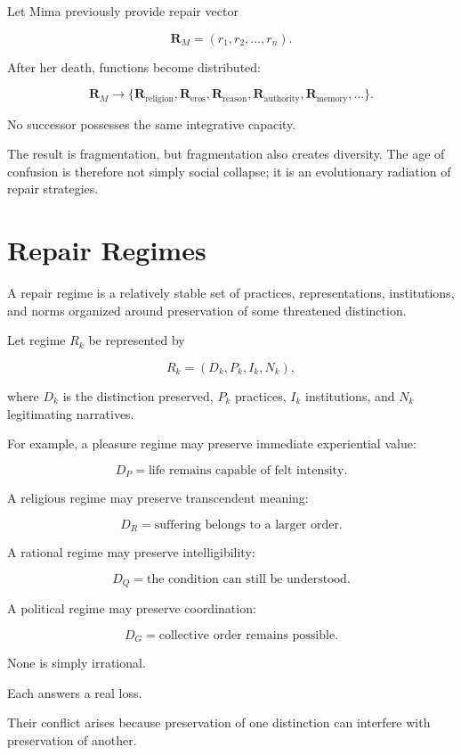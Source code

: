 \documentclass[11pt,oneside]{book}
\theoremstyle{definition}
\theoremstyle{remark}
\begin{document}
Let Mima previously provide repair vector

\[
\mathbf R_M
=
(r_1,r_2,\ldots,r_n).
\]

After her death, functions become distributed:

\[
\mathbf R_M
\rightarrow
\{
\mathbf R_{\mathrm{religion}},
\mathbf R_{\mathrm{eros}},
\mathbf R_{\mathrm{reason}},
\mathbf R_{\mathrm{authority}},
\mathbf R_{\mathrm{memory}},
\ldots
\}.
\]

No successor possesses the same integrative capacity.

The result is fragmentation, but fragmentation also creates diversity. The age of confusion is therefore not simply social collapse; it is an evolutionary radiation of repair strategies.

\section{Repair Regimes}

A repair regime is a relatively stable set of practices, representations, institutions, and norms organized around preservation of some threatened distinction.

Let regime \(R_k\) be represented by

\[
R_k
=
(D_k,P_k,I_k,N_k),
\]

where \(D_k\) is the distinction preserved, \(P_k\) practices, \(I_k\) institutions, and \(N_k\) legitimating narratives.

For example, a pleasure regime may preserve immediate experiential value:

\[
D_P
=
\text{life remains capable of felt intensity}.
\]

A religious regime may preserve transcendent meaning:

\[
D_R
=
\text{suffering belongs to a larger order}.
\]

A rational regime may preserve intelligibility:

\[
D_Q
=
\text{the condition can still be understood}.
\]

A political regime may preserve coordination:

\[
D_G
=
\text{collective order remains possible}.
\]

None is simply irrational.

Each answers a real loss.

Their conflict arises because preservation of one distinction can interfere with preservation of another.
\end{document}
